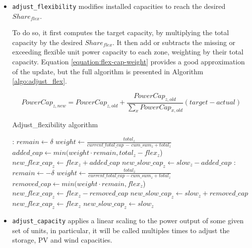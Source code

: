 \begin{itemize}
    \item \texttt{adjust\_flexibility} modifies installed capacities to reach the desired $Share_{flex}$.
    
    To do so, it first computes the target capacity, by multiplying the total capacity by the desired $Share_{flex}$. It then add or subtracts the missing or exceeding flexible unit power capacity to each zone, weighting by their total capacity. Equation \ref{equation:flex-cap-weight} provides a good approximation of the update, but the full algorithm is presented in Algorithm \ref{algo:adjust_flex}.

    \begin{equation}
        PowerCap_{z,new} = PowerCap_{z,old} + \frac{PowerCap_{z,old}}{\sum_x PowerCap_{x,old}} (target-actual)
        \label{equation:flex-cap-weight}
    \end{equation}

    \begin{algorithm}[h]
        \caption{Adjust\_flexibility algorithm} \label{algo:adjust_flex}
        \begin{algorithmic}[1]
            : 
                \State $remain \gets \delta$
                \State $weight \gets \frac{total_{z}}{current\_total\_cap \, - \, cum\_sum_{z}+total_{z}}$
                \State $added\_cap \gets min (weight \cdot remain, total_{z} - flex_{z}$)
                \State $new\_flex\_cap_{z} \gets flex_{z} + added\_cap$
                \State $new\_slow\_cap_{z} \gets slow_{z} - added\_cap$
                \EndFor
            : 
            \State $remain \gets - \delta$
            \State $weight \gets \frac{total_{z}}{current\_total\_cap-cum\_sum_{z}+total_{z}}$
            \State $removed\_cap \gets min (weight \cdot remain, flex_{z}$)
            \State $new\_flex\_cap_{z} \gets flex_{z} - removed\_cap$
            \State $new\_slow\_cap_{z} \gets slow_{z} + removed\_cap$
            \EndFor
            \Else
            \State $new\_flex\_cap_{z} \gets flex_{z}$
            \State $new\_slow\_cap_{z} \gets slow_{z}$
            \EndIf
        \end{algorithmic}
    \end{algorithm}

    \item \texttt{adjust\_capacity} applies a linear scaling to the power output of some given set of units, in particular, it will be called multiples times to adjust the storage, PV and wind capacities.
    

\end{itemize}
